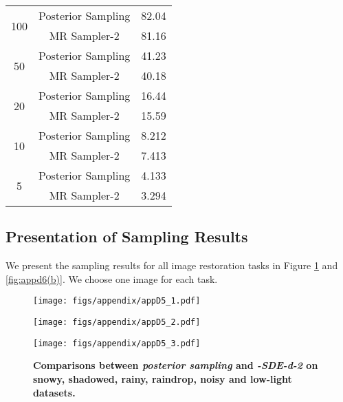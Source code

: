 \begin{table}[ht]
\begin{minipage}{0.45\textwidth}
{\begin{tabular}{ccc}
            \midrule[0.8pt]
            \multirow{2}{*}{100}
             & Posterior Sampling & 82.04 \\
             & MR Sampler-2 & 81.16 \\
            \cmidrule(lr){1-3}
            \multirow{2}{*}{50}
             & Posterior Sampling & 41.23  \\
             & MR Sampler-2 & 40.18  \\
            \cmidrule(lr){1-3}
            \multirow{2}{*}{20}
              & Posterior Sampling & 16.44  \\
              & MR Sampler-2 & 15.59  \\
            \cmidrule(lr){1-3}
            \multirow{2}{*}{10}
              & Posterior Sampling & 8.212  \\
              & MR Sampler-2 & 7.413  \\
            \cmidrule(lr){1-3}
            \multirow{2}{*}{5}
              & Posterior Sampling & 4.133  \\
              & MR Sampler-2 & 3.294  \\       
            \bottomrule[1.2pt]
        \end{tabular}}
        \label{tab:time2}
    \end{minipage}
\end{table}


\subsection{Presentation of Sampling Results}
\label{appd6}

We present the sampling results for all image restoration tasks in Figure \ref{fig:appd6(a)} and \ref{fig:appd6(b)}. We choose one image for each task.

\begin{figure}[h]
    \centering
    \begin{minipage}[t]{0.95\linewidth}
    \centering
    \texttt{[image: figs/appendix/appD5\_1.pdf]} %
    \end{minipage}
    \begin{minipage}[t]{0.95\linewidth}
        \centering
        \texttt{[image: figs/appendix/appD5\_2.pdf]} %
    \end{minipage}
    \begin{minipage}[t]{0.95\linewidth}
        \centering
        \texttt{[image: figs/appendix/appD5\_3.pdf]} %
    \end{minipage}
    \caption{\textbf{Comparisons between \textit{posterior sampling} and \textit{\ourmethod-SDE-d-2} on snowy, shadowed, rainy, raindrop, noisy and low-light datasets.}}
    \label{fig:appd6(a)}
\end{figure}

